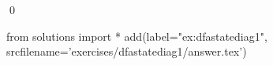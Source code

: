 
\begin{ex} 
  \label{ex:dfastatediag1}
  
  \qed
\end{ex} 
\begin{python0}
from solutions import *
add(label="ex:dfastatediag1",
    srcfilename='exercises/dfastatediag1/answer.tex') 
\end{python0}
